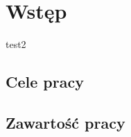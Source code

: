 \chapter{Wstęp}
\label{cha:wprowadzenie}
test2
\section{Cele pracy}
\label{sec:celePracy}

\section{Zawartość pracy}
\label{sec: zawartosc_pracy}


















